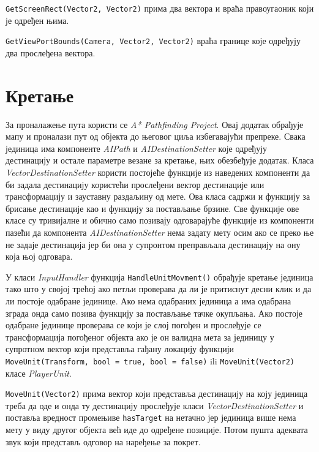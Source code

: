 \documentclass[11pt,a4paper]{article}
\begin{document}
\texttt{GetScreenRect(Vector2, Vector2)} прима два вектора  и враћа правоугаоник који је одређен њима.

\texttt{GetViewPortBounds(Camera, Vector2, Vector2)} враћа границе које одређују два прослеђена вектора.

\section{Кретање}
За проналажење пута користи се \emph{A* Pathfinding Project}. Овај додатак обрађује мапу и проналази пут од објекта до његовог циља избегавајући препреке. Свака јединица има компоненте \emph{AIPath} и \emph{AIDestinationSetter} које одређују дестинацију и остале параметре везане за кретање, њих обезбеђује додатак. Класа \emph{VectorDestinationSetter} користи постојеће функције из наведених компоненти да би задала дестинацију користећи прослеђени вектор дестинације или трансформацију и зауставну раздаљину од мете. Ова класа садржи и функцију за брисање дестинације као и функцију за постављање брзине. Све функције ове класе су тривијалне и обично само позивају одговарајуће функције из компоненти пазећи да компонента \emph{AIDestinationSetter} нема задату мету осим ако се преко ње не задаје дестинација јер би она у супронтом преправљала дестинацију на ону која њој одговара.

У класи \emph{InputHandler} функција  \texttt{HandleUnitMovment()} обрађује кретање јединица тако што у својој трећој ако петљи проверава да ли је притиснут десни клик и да ли постоје одабране јединице. Ако нема одабраних јединица а има одабрана зграда онда само позива функцију за постављање тачке окупљања. Ако постоје одабране јединице проверава се који је слој погођен и прослеђује се трансформација погођеног објекта ако је он валидна мета за јединицу у супротном вектор који представља гађану локацију функцији \texttt{MoveUnit(Transform, bool = true, bool = false)} ili  \texttt{MoveUnit(Vector2)} класе \emph{PlayerUnit}.

\texttt{MoveUnit(Vector2)} прима вектор који представља дестинацију  на коју јединица треба да оде и онда ту дестинацију прослеђује класи \emph{VectorDestinationSetter} и поставља вредност промењиве \texttt{hasTarget} на нетачно јер јединица више нема мету у виду другог објекта већ иде до одређене позиције. Потом пушта адеквата звук који представљ одговор на наређење за покрет.
\end{document}
